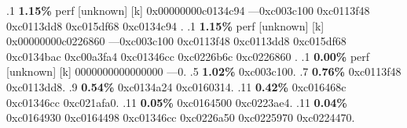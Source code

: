 \begin{profile}
{.1 \textbf{ 1.15\%} perf             [unknown]              [k] 0x00000000c0134c94\newline {} ---0xc003c100\newline {} 0xc0113f48\newline {} 0xc0113dd8\newline {} 0xc015df68\newline {} 0xc0134c94\newline {} . 
.1 \textbf{ 1.15\%} perf             [unknown]              [k] 0x00000000c0226860\newline {} ---0xc003c100\newline {} 0xc0113f48\newline {} 0xc0113dd8\newline {} 0xc015df68\newline {} 0xc0134bac\newline {} 0xc00a3fa4\newline {} 0xc01346cc\newline {} 0xc0226b6c\newline {} 0xc0226860\newline {} . 
.1 \textbf{ 0.00\%} perf             [unknown]              [k] 0000000000000000\newline {} ---0. 
.5 \textbf{1.02\%} 0xc003c100. 
.7 \textbf{0.76\%} 0xc0113f48\newline {} 0xc0113dd8. 
.9 \textbf{0.54\%} 0xc0134a24\newline {} 0xc0160314. 
.11 \textbf{0.42\%} 0xc016468c\newline {} 0xc01346cc\newline {} 0xc021afa0. 
.11 \textbf{0.05\%} 0xc0164500\newline {} 0xc0223ae4. 
.11 \textbf{0.04\%} 0xc0164930\newline {} 0xc0164498\newline {} 0xc01346cc\newline {} 0xc0226a50\newline {} 0xc0225970\newline {} 0xc0224470. 
}
\end{profile}
